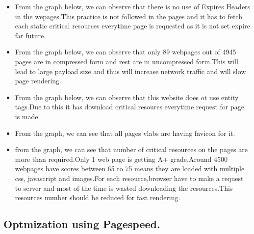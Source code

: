 \documentclass[a4paper,10pt]{IEEEtran}
\begin{document}
\begin{itemize}
\item From the graph below, we can observe that there is no use of Expires
Headers in the wepages.This practice is not followed in the pages and it has to
fetch each static critical resources everytime page is requested as it is not
set expire far future.

\item From the graph below, we can observe that only 89 webpages out of 4945
pages are in compressed form and rest are in uncompressed form.This will lead to
large payload size and thus will increase network traffic and will slow page
rendering.
\item From the graph below, we can observe that this website does ot use entity
tags.Due to this it has download critical resoures everytime request for page is
made.
\item From the graph, we can see that all pages vlabs are having favicon for it.
\item from the graph, we can see that number of critical resources  on the pages
are more than required.Only 1 web page is getting A+ grade.Around 4500 webpages
have scores between 65 to 75 means they are loaded with multiple css, javascript
and images.For each resource,browser have to make a request to server and most
of the time is wasted downloading the resources.This resources  number should be
reduced for fast rendering.
\end{itemize}
\subsection{Optmization using Pagespeed.}
\label{sec-6.2}
\end{document}
